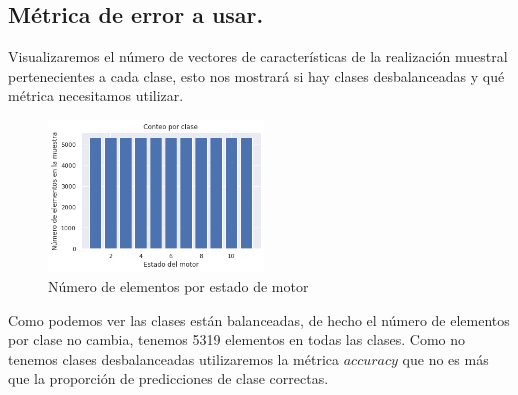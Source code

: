 \documentclass[11pt,a4paper]{article}
\theoremstyle{definition}
\begin{document}
	\subsection{Métrica de error a usar.}
	Visualizaremos el número de vectores de características de la realización muestral pertenecientes a cada clase, esto nos mostrará si hay clases desbalanceadas y qué métrica necesitamos utilizar.
	\begin{figure}[H]
		\centering
		\includegraphics[width=0.51\textwidth]{images/conteo_por_clase}
		\caption{Número de elementos por estado de motor}
	\end{figure}
	
	Como podemos ver las clases están balanceadas, de hecho el número de elementos por clase no cambia, tenemos 5319 elementos en todas las clases. Como no tenemos clases desbalanceadas utilizaremos la métrica $accuracy$ que no es más que la proporción de predicciones de clase correctas.
	
	
\end{document}
